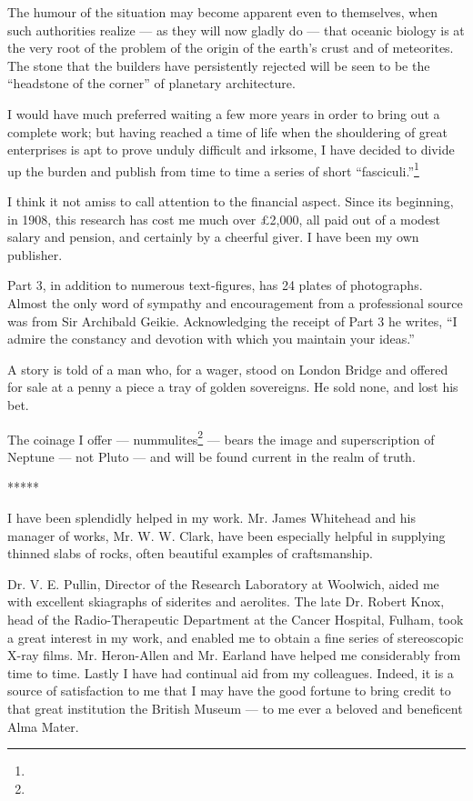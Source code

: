 \documentclass[a4paper, 12pt, oneside]{article}
\begin{document}
The humour of the situation may become apparent even to themselves, when such authorities realize --- as they will now gladly do --- that oceanic biology is at the very root of the problem of the origin of the earth's crust and of meteorites. The stone that the builders have persistently rejected will be seen to be the ``headstone of the corner'' of planetary architecture.

I would have much preferred waiting a few more years in order to bring out a complete work; but having reached a time of life when the shouldering of great enterprises is apt to prove unduly difficult and irksome, I have decided to divide up the burden and publish from time to time a series of short ``fasciculi.''\footnote{}

I think it not amiss to call attention to the financial aspect. Since its beginning, in 1908, this research has cost me much over £2,000, all paid out of a modest salary and pension, and certainly by a cheerful giver. I have been my own publisher.

Part 3, in addition to numerous text-figures, has 24 plates of photographs. Almost the only word of sympathy and encouragement from a professional source was from Sir Archibald Geikie. Acknowledging the receipt of Part 3 he writes, ``I admire the constancy and devotion with which you maintain your ideas.''

A story is told of a man who, for a wager, stood on London Bridge and offered for sale at a penny a piece a tray of golden sovereigns. He sold none, and lost his bet.

The coinage I offer --- nummulites\footnote{} --- bears the image and superscription of Neptune --- not Pluto --- and will be found current in the realm of truth.

\centerline{*\hspace{15mm}*\hspace{15mm}*\hspace{15mm}*\hspace{15mm}*}
\bigskip

I have been splendidly helped in my work. Mr. James Whitehead and his manager of works, Mr. W. W. Clark, have been especially helpful in supplying thinned slabs of rocks, often beautiful examples of craftsmanship.

Dr. V. E. Pullin, Director of the Research Laboratory at Woolwich, aided me with excellent skiagraphs of siderites and aerolites. The late Dr. Robert Knox, head of the Radio-Therapeutic Department at the Cancer Hospital, Fulham, took a great interest in my work, and enabled me to obtain a fine series of stereoscopic X-ray films. Mr. Heron-Allen and Mr. Earland have helped me considerably from time to time. Lastly I have had continual aid from my colleagues. Indeed, it is a source of satisfaction to me that I may have the good fortune to bring credit to that great institution the British Museum --- to me ever a beloved and beneficent Alma Mater.
\clearpage
\end{document}
